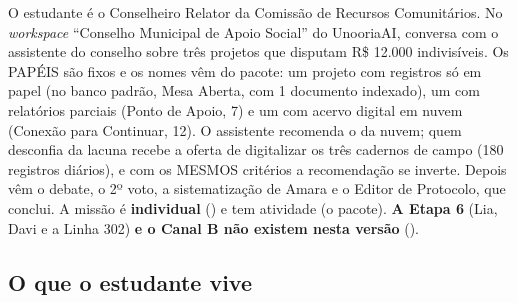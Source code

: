 O estudante é o Conselheiro Relator da Comissão de Recursos Comunitários. No
\emph{workspace} \enquote{Conselho Municipal de Apoio Social} do UnooriaAI,
conversa com o assistente do conselho sobre três projetos que disputam R\$
12.000 indivisíveis. Os PAPÉIS são fixos e os nomes vêm do pacote: um
projeto com registros só em papel (no banco padrão, Mesa Aberta, com 1
documento indexado), um com relatórios parciais (Ponto de Apoio, 7) e um com
acervo digital em nuvem (Conexão para Continuar, 12). O assistente recomenda
o da nuvem; quem desconfia da lacuna recebe a oferta de digitalizar os três
cadernos de campo (180 registros diários), e com os MESMOS critérios a
recomendação se inverte. Depois vêm o debate, o 2º voto, a sistematização de
Amara e o Editor de Protocolo, que conclui. A missão é \textbf{individual}
() e tem atividade (o pacote). \textbf{A Etapa 6}
(Lia, Davi e a Linha 302) \textbf{e o Canal B não existem nesta versão}
().

\subsection{O que o estudante vive}

